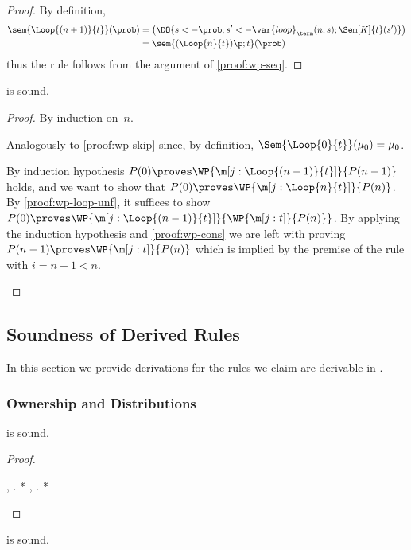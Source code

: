 \documentclass[acmsmall,nonacm,screen,appendix]{acmart}
\begin{document}
\begin{proof}
  By definition,
  \begin{align*}
    \sem{\Loop{(n+1)}{t}}(\prob)
    &= \bigl(
         \DO{s <- \prob; s' <- \var{loop}_{\term}(n,s); \Sem[K]{t}(s')}
       \bigr) \\
    &= \sem{(\Loop{n}{t})\p;t}(\prob)
  \end{align*}
  thus the rule follows from the argument of \cref{proof:wp-seq}.
\end{proof} \begin{lemma}
\label{proof:wp-loop}
   is sound.
\end{lemma}

\begin{proof}
  By induction on~$n$.
  \begin{induction}
    \step[Base case~$n=0$]
      Analogously to \cref{proof:wp-skip}
      since, by definition,
      $\Sem{\Loop{0}{t}}(\mu_0) = \mu_0$.

      By induction hypothesis
      $P(0) \proves \WP{\m[j: \Loop{(n-1)}{t}]}{P(n-1)}$ holds,
      and we want to show that
      $P(0) \proves \WP{\m[j: \Loop{n}{t}]}{P(n)}$.
      By \cref{proof:wp-loop-unf},
      it suffices to show
      $ P(0) \proves \WP{\m[j: \Loop{(n-1)}{t}]}{\WP {\m[j:t]}{P(n)}} $.
      By applying the induction hypothesis and \cref{proof:wp-cons} we are left
      with proving
      $ P(n-1) \proves \WP {\m[j:t]}{P(n)} $
      which is implied by the premise of the rule with $i=n-1 < n$.
    \qedhere
  \end{induction}
\end{proof}
 
\subsection{Soundness of Derived Rules}
\label{sec:appendix:derived-rules}


In this section we provide derivations for the rules we claim
are derivable in \thelogic.


\subsubsection{Ownership and Distributions}
\begin{lemma}
\label{proof:sure-dirac}
   is sound.
\end{lemma}

\begin{proof}
  \begin{eqexplain}
\whichisequiv*
    \E \m{\sigmaF}, \m{\prob}.
      \Own{(\m{\sigmaF}, \m{\prob})}
      *
\whichisequiv
    \E \m{\sigmaF}, \m{\prob}.
      \Own{(\m{\sigmaF}, \m{\prob})}
      *
\whichisequiv
\qedhere
  \end{eqexplain}
\end{proof} \begin{lemma}
\label{proof:sure-eq-inj}
   is sound.
\end{lemma}
\end{document}
